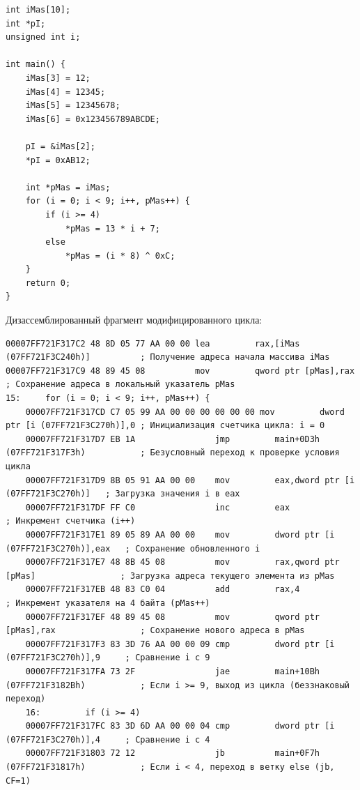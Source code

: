 \documentclass[14pt, a4paper]{extarticle}
\begin{document}
	\begin{lstlisting}[caption={Модифицированная программа с доступом через указатель}]
int iMas[10];
int *pI;
unsigned int i;

int main() {
	iMas[3] = 12;
	iMas[4] = 12345;
	iMas[5] = 12345678;
	iMas[6] = 0x123456789ABCDE;

	pI = &iMas[2];
	*pI = 0xAB12;

	int *pMas = iMas;
	for (i = 0; i < 9; i++, pMas++) {
		if (i >= 4)
			*pMas = 13 * i + 7;
		else
			*pMas = (i * 8) ^ 0xC;
	}
	return 0;
}
	\end{lstlisting}

	Дизассемблированный фрагмент модифицированного цикла:
	\begin{lstlisting}[language={[x86masm]Assembler}, caption={Дизассемблерный код цикла при работе через указатель}]
00007FF721F317C2 48 8D 05 77 AA 00 00 lea         rax,[iMas (07FF721F3C240h)]          ; Получение адреса начала массива iMas
00007FF721F317C9 48 89 45 08          mov         qword ptr [pMas],rax                 ; Сохранение адреса в локальный указатель pMas
15: 	for (i = 0; i < 9; i++, pMas++) {
	00007FF721F317CD C7 05 99 AA 00 00 00 00 00 00 mov         dword ptr [i (07FF721F3C270h)],0 ; Инициализация счетчика цикла: i = 0
	00007FF721F317D7 EB 1A                jmp         main+0D3h (07FF721F317F3h)           ; Безусловный переход к проверке условия цикла
	00007FF721F317D9 8B 05 91 AA 00 00    mov         eax,dword ptr [i (07FF721F3C270h)]   ; Загрузка значения i в eax
	00007FF721F317DF FF C0                inc         eax                                  ; Инкремент счетчика (i++)
	00007FF721F317E1 89 05 89 AA 00 00    mov         dword ptr [i (07FF721F3C270h)],eax   ; Сохранение обновленного i
	00007FF721F317E7 48 8B 45 08          mov         rax,qword ptr [pMas]                 ; Загрузка адреса текущего элемента из pMas
	00007FF721F317EB 48 83 C0 04          add         rax,4                                ; Инкремент указателя на 4 байта (pMas++)
	00007FF721F317EF 48 89 45 08          mov         qword ptr [pMas],rax                 ; Сохранение нового адреса в pMas
	00007FF721F317F3 83 3D 76 AA 00 00 09 cmp         dword ptr [i (07FF721F3C270h)],9     ; Сравнение i с 9
	00007FF721F317FA 73 2F                jae         main+10Bh (07FF721F3182Bh)           ; Если i >= 9, выход из цикла (беззнаковый переход)
	16: 		if (i >= 4)
	00007FF721F317FC 83 3D 6D AA 00 00 04 cmp         dword ptr [i (07FF721F3C270h)],4     ; Сравнение i с 4
	00007FF721F31803 72 12                jb          main+0F7h (07FF721F31817h)           ; Если i < 4, переход в ветку else (jb, CF=1)

\end{lstlisting}
\end{document}
